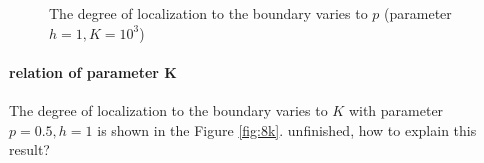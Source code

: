 \documentclass[12pt,a4paper]{article}
\begin{document}
\begin{figure}[h]
\centering
{}
\caption{The degree of localization to the boundary varies to $p$ (parameter $h=1, K=10^3$)}
\label{fig:8p}
\end{figure}


\paragraph{relation of parameter K}

The degree of localization to the boundary varies to $K$ with parameter $p=0.5, h=1$ is shown in the Figure \ref{fig:8k}. {\color{red} unfinished, how to explain this result?}
\end{document}
